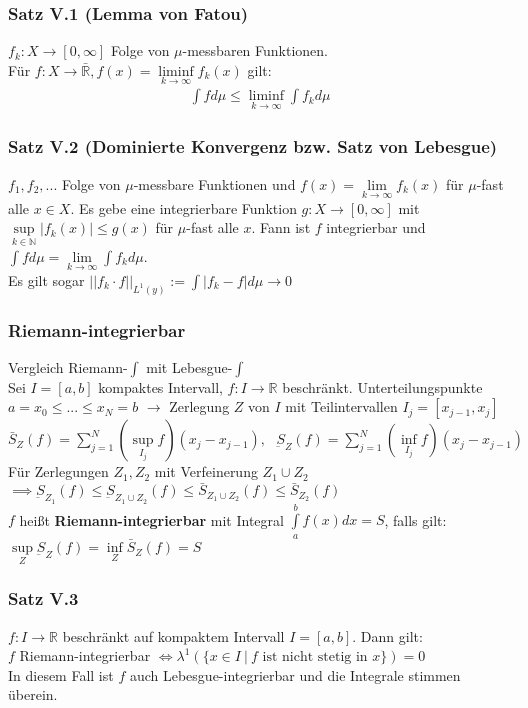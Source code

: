 
\begin{frame}
\frametitle{Satz V.1 (Lemma von Fatou)}
$f_k: X \to [0,\infty]$ Folge von $\mu$-messbaren Funktionen.\\
    Für $f: X \to \bar{\mathbb{R}}, f(x) = \liminf\limits_{k \to \infty} f_k(x)$ gilt:
    \begin{align*}
      \int f d\mu \leq \liminf\limits_{k \to \infty} \int f_k d\mu
    \end{align*}
\end{frame}


\begin{frame}
\frametitle{Satz V.2 (Dominierte Konvergenz bzw. Satz von Lebesgue)}
$f_1, f_2, ...$ Folge von $\mu$-messbare Funktionen und $f(x) = \lim\limits_{k \to \infty} f_k(x)$ für $\mu$-fast alle $x \in X$. Es gebe eine integrierbare Funktion $g: X \to [0, \infty]$ mit $\sup\limits_{k \in \mathbb{N}} |f_k(x)| \leq g(x)$ für $\mu$-fast alle $x$. Fann ist $f$ integrierbar und $\int f d\mu = \lim\limits_{k \to \infty} \int f_k d\mu$.\\
    Es gilt sogar $||f_k \cdot f||_{L^1(y)} := \int |f_k -f| d\mu \to 0$
\end{frame}


\begin{frame}
\frametitle{Riemann-integrierbar}
Vergleich Riemann-$\int$ mit Lebesgue-$\int$\\
    Sei $I=[a,b]$ kompaktes Intervall, $f:I \to \mathbb{R}$ beschränkt. Unterteilungspunkte $a = x_0 \leq ... \leq x_N = b$ $\to$ Zerlegung $Z$ von $I$ mit Teilintervallen $I_j = [x_{j-1}, x_j]$\\
    $\bar{S}_Z(f) = \sum\limits_{j=1}^N (\sup\limits_{I_j} f) (x_j - x_{j-1}), \ \ \ \underbar{S}_Z(f)= \sum\limits_{j=1}^N (\inf\limits_{I_j} f)(x_j-x_{j-1})$\\
    Für Zerlegungen $Z_1, Z_2$ mit Verfeinerung $Z_1 \cup Z_2$\\
    $\implies \underbar{S}_{Z_1}(f) \leq \underbar{S}_{Z_1 \cup Z_2}(f) \leq \bar{S}_{Z_1 \cup Z_2}(f) \leq \bar{S}_{Z_2}(f)$\\
    $f$ heißt \textbf{Riemann-integrierbar} mit Integral $\int\limits_a^b f(x) dx = S$, falls gilt:\\
    $\sup\limits_Z \underbar{S}_Z(f) = \inf\limits_Z \bar{S}_Z(f) = S$
\end{frame}


\begin{frame}
\frametitle{Satz V.3}
$f: I \to \mathbb{R}$ beschränkt auf kompaktem Intervall $I=[a,b]$. Dann gilt:\\
    $f$ Riemann-integrierbar $\Leftrightarrow \lambda^1(\{x \in I \ | \ f \text{ ist nicht stetig in } x\}) = 0$\\
    In diesem Fall ist $f$ auch Lebesgue-integrierbar und die Integrale stimmen überein.
\end{frame}


